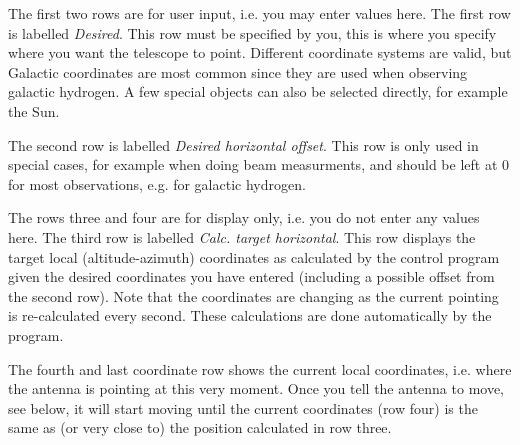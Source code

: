 The first two rows are for user input, i.e. you may enter values here.  The
first row is labelled \emph{Desired}. This row must be specified by you, this
is where you specify where you want the telescope to point. Different
coordinate systems are valid, but Galactic coordinates are most common since
they are used when observing galactic hydrogen. A few special objects can also
be selected directly, for example the Sun.

The second row is labelled
\emph{Desired horizontal offset}. This row is only used in special cases, for
example when doing beam measurments, and should be left at 0 for most
observations, e.g. for galactic hydrogen. 

The rows three and four are for display only, i.e. you do not enter any values
here.  The third row is labelled \emph{Calc. target horizontal}. This row
displays the target local (altitude-azimuth) coordinates as calculated by the
control program given the desired coordinates you have entered (including a
possible offset from the second row). Note that the coordinates are changing
as the current pointing is re-calculated every second. These calculations
are done automatically by the program. 

The fourth and last coordinate row shows the current local coordinates, i.e.
where the antenna is pointing at this very moment. Once you tell the antenna
to move, see below, it will start moving until the current coordinates (row four)
is the same as (or very close to) the position calculated in row three.

